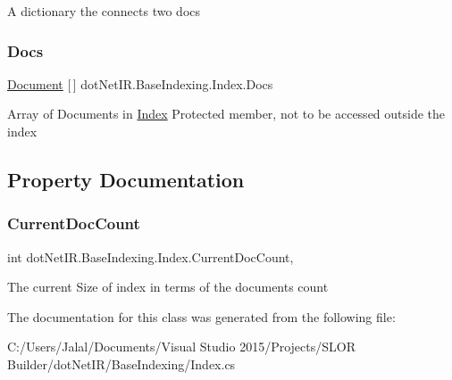 A dictionary the connects two docs 

\hypertarget{classdot_net_i_r_1_1_base_indexing_1_1_index_a3d39c5f32ca9bc6bc076ebcbc72b9923}{}\label{classdot_net_i_r_1_1_base_indexing_1_1_index_a3d39c5f32ca9bc6bc076ebcbc72b9923} 
\subsubsection{\texorpdfstring{Docs}{Docs}}
{\footnotesize\ttfamily \hyperlink{classdot_net_i_r_1_1_base_indexing_1_1_document}{Document} \mbox{[}$\,$\mbox{]} dot\+Net\+I\+R.\+Base\+Indexing.\+Index.\+Docs\hspace{0.3cm}{\ttfamily [protected]}}



Array of Documents in \hyperlink{classdot_net_i_r_1_1_base_indexing_1_1_index}{Index} Protected member, not to be accessed outside the index 



\subsection{Property Documentation}
\hypertarget{classdot_net_i_r_1_1_base_indexing_1_1_index_ac114b35f0475c33f94d8dad4b3942343}{}\label{classdot_net_i_r_1_1_base_indexing_1_1_index_ac114b35f0475c33f94d8dad4b3942343} 
\subsubsection{\texorpdfstring{Current\+Doc\+Count}{CurrentDocCount}}
{\footnotesize\ttfamily int dot\+Net\+I\+R.\+Base\+Indexing.\+Index.\+Current\+Doc\+Count\hspace{0.3cm}{\ttfamily [get]}, {}}



The current Size of index in terms of the documents count 



The documentation for this class was generated from the following file\+:\begin{DoxyCompactItemize}
\item 
C\+:/\+Users/\+Jalal/\+Documents/\+Visual Studio 2015/\+Projects/\+S\+L\+O\+R Builder/dot\+Net\+I\+R/\+Base\+Indexing/Index.\+cs\end{DoxyCompactItemize}
